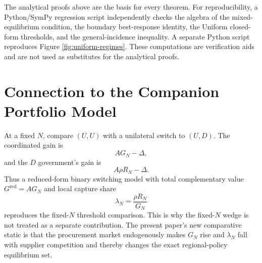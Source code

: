 The analytical proofs above are the basis for every theorem. For reproducibility, a Python/SymPy regression script independently checks the algebra of the mixed-equilibrium condition, the boundary best-response identity, the Uniform closed-form thresholds, and the general-incidence inequality. A separate Python script reproduces Figure \ref{fig:uniform-regimes}. These computations are verification aids and are not used as substitutes for the analytical proofs.

\section{Connection to the Companion Portfolio Model}
\label{app:companion}

At a fixed $N$, compare $(U,U)$ with a unilateral switch to $(U,D)$. The coordinated gain is
\begin{equation}
A G_N-\Delta,
\end{equation}
and the $D$ government's gain is
\begin{equation}
A\rho R_N-\Delta.
\end{equation}
Thus a reduced-form binary switching model with total complementary value $G^{\mathrm{red}}=A G_N$ and local capture share
\begin{equation}
\lambda_N=\frac{\rho R_N}{G_N}
\end{equation}
reproduces the fixed-$N$ threshold comparison. This is why the fixed-$N$ wedge is not treated as a separate contribution. The present paper's new comparative static is that the procurement market endogenously makes $G_N$ rise and $\lambda_N$ fall with supplier competition and thereby changes the exact regional-policy equilibrium set.
